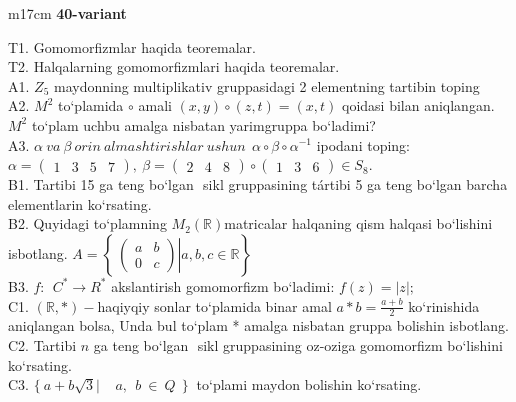 \documentclass{article}
\begin{document}
\begin{tabular}{m{17cm}}
\textbf{40-variant}
\newline

T1. Gomomorfizmlar haqida teoremalar. \\
T2. Halqalarning gomomorfizmlari haqida teoremalar. \\
A1. \(Z_{5}\) maydonning multiplikativ gruppasidagi 2 elementning tartibin toping \\
A2. \(M^{2}\) to`plamida \(\circ\) amali \((x,y) \circ (z,t) = (x,t)\) qoidasi bilan aniqlangan. \(M^{2}\) to`plam uchbu amalga nisbatan yarimgruppa bo`ladimi? \\
A3. \(\alpha\ va\ \beta\ orin\ almashtirishlar\ ushun\ \ \alpha \circ \beta \circ \alpha^{- 1}\) ipodani toping:\(\alpha = \begin{pmatrix}
1 & 3 & 5 & 7
\end{pmatrix},\ \beta = \begin{pmatrix}
2 & 4 & 8
\end{pmatrix} \circ \begin{pmatrix}
1 & 3 & 6
\end{pmatrix} \in S_{8}\). \\
B1. Tartibi 15 ga teng bo`lgan \(< a >\) sikl gruppasining tártibi 5 ga teng bo`lgan barcha elementlarin ko`rsating. \\
B2. Quyidagi to`plamning \(M_{2}(\mathbb{R})\)matricalar halqaning qism halqasi bo`lishini isbotlang. \(A = \left\{ \left. \ \begin{pmatrix}
a & b \\
0 & c
\end{pmatrix} \right|a,b,c\mathbb{\in R} \right\}\) \\
B3. \(f:\ \ C^{*} \rightarrow R^{*}\) akslantirish gomomorfizm bo`ladimi: \(f(z) = |z|;\) \\
C1. \((\mathbb{R},*) -\)haqiyqiy sonlar to`plamida binar amal \(a*b = \frac{a + b}{2}\) ko`rinishida aniqlangan bolsa, Unda bul to`plam * amalga nisbatan gruppa bolishin isbotlang. \\
C2. Tartibi \(n\) ga teng bo`lgan \(< a >\) sikl gruppasining o\textquotesingle z-o\textquotesingle ziga gomomorfizm bo`lishini ko`rsating. \\
C3. \(\{\ a + b\sqrt{3}\left| \ \ \ \ \ a,\ \ b\  \in \ Q\ \ \} \right.\ \) to`plami maydon bo\textquotesingle lishin ko`rsating. \\

\end{tabular}
\vspace{1cm}
\end{document}
